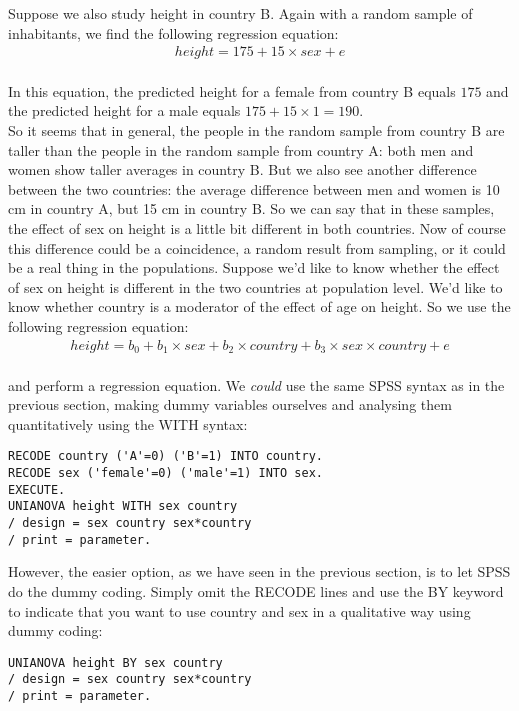 Suppose we also study height in country B. Again with a random sample of inhabitants, we find the following regression equation:
\\
\begin{eqnarray} 
height = 175 + 15  \times sex + e \nonumber
\end{eqnarray}
\\
In this equation, the predicted height for a female from country B equals $175$ and the predicted height for a male equals $175 + 15 \times 1 = 190$.\\

So it seems that in general, the people in the random sample from country B are taller than the people in the random sample from country A: both men and women show taller averages in country B. But we also see another difference between the two countries: the average difference between men and women is 10 cm in country A, but 15 cm in country B. So we can say that in these samples, the effect of sex on height is a little bit different in both countries. Now of course this difference could be a coincidence, a random result from sampling, or it could be a real thing in the populations. Suppose we'd like to know whether the effect of sex on height is different in the two countries at population level. We'd like to know whether country is a moderator of the effect of age on height. So we use the following regression equation:
\\
\begin{eqnarray} 
height = b_0 + b_1  \times sex + b_2 \times country +  b_3 \times sex \times country + e \nonumber
\end{eqnarray}
\\
and perform a regression equation. We \textit{could} use the same SPSS syntax as in the previous section, making dummy variables ourselves and analysing them quantitatively using the WITH syntax:
\begin{verbatim}
RECODE country ('A'=0) ('B'=1) INTO country.
RECODE sex ('female'=0) ('male'=1) INTO sex.
EXECUTE.
UNIANOVA height WITH sex country 
/ design = sex country sex*country
/ print = parameter.
\end{verbatim}

However, the easier option, as we have seen in the previous section, is to let SPSS do the dummy coding. Simply omit the RECODE lines and use the BY keyword to indicate that you want to use country and sex in a qualitative way using dummy coding:

\begin{verbatim}
UNIANOVA height BY sex country 
/ design = sex country sex*country
/ print = parameter.
\end{verbatim}

